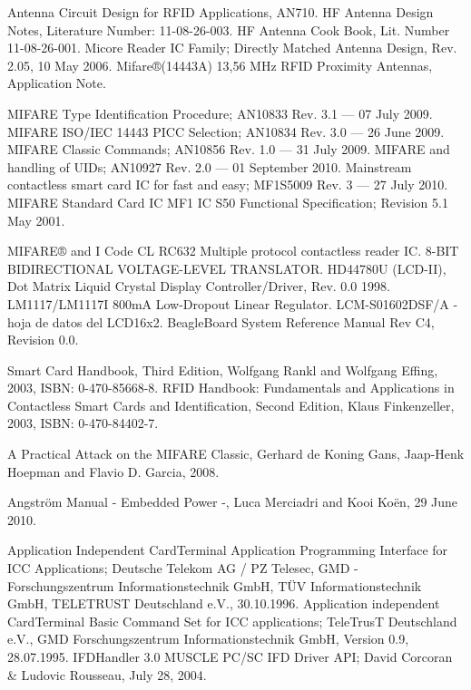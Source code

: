 \begin{thebibliography}{200}

 Antenna Circuit Design for RFID Applications, AN710.
 HF Antenna Design Notes, Literature Number: 11-08-26-003.
 HF Antenna Cook Book, Lit. Number 11-08-26-001.
 Micore Reader IC Family; Directly Matched Antenna Design, Rev. 2.05, 10 May 2006.
 Mifare®(14443A) 13,56 MHz RFID Proximity Antennas, Application Note.

\bibitem{} MIFARE Type Identification Procedure; AN10833 Rev. 3.1 — 07 July 2009.
\bibitem{} MIFARE ISO/IEC 14443 PICC Selection; AN10834 Rev. 3.0 — 26 June 2009.
\bibitem{} MIFARE Classic Commands; AN10856 Rev. 1.0 — 31 July 2009.
\bibitem{} MIFARE and handling of UIDs; AN10927 Rev. 2.0 — 01 September 2010.
\bibitem{} Mainstream contactless smart card IC for fast and easy; MF1S5009 Rev. 3 — 27 July 2010.
\bibitem{} MIFARE Standard Card IC MF1 IC S50 Functional Specification; Revision 5.1 May 2001.

 MIFARE® and I Code CL RC632 Multiple protocol contactless reader IC.
 8-BIT BIDIRECTIONAL VOLTAGE-LEVEL TRANSLATOR.
 HD44780U (LCD-II), Dot Matrix Liquid Crystal Display Controller/Driver, Rev. 0.0 1998. 
 LM1117/LM1117I 800mA Low-Dropout Linear Regulator.
 LCM-S01602DSF/A - hoja de datos del LCD16x2.
 BeagleBoard System Reference Manual Rev C4, Revision 0.0.

 Smart Card Handbook, Third Edition, Wolfgang Rankl and Wolfgang Effing, 2003, ISBN: 0-470-85668-8. 
 RFID Handbook: Fundamentals and Applications in Contactless Smart Cards and Identification,
Second Edition, Klaus Finkenzeller, 2003, ISBN: 0-470-84402-7. 


 A Practical Attack on the MIFARE Classic, Gerhard de Koning Gans, Jaap-Henk Hoepman and Flavio D. Garcia, 2008.

 Angström Manual - Embedded Power -, Luca Merciadri and Kooi Koën, 29 June 2010.


 Application Independent CardTerminal Application Programming Interface for ICC Applications; 
Deutsche Telekom AG / PZ Telesec, GMD - Forschungszentrum Informationstechnik GmbH, TÜV Informationstechnik GmbH, TELETRUST Deutschland e.V., 30.10.1996.
 Application independent CardTerminal Basic Command Set for ICC applications; 
TeleTrusT Deutschland e.V., GMD Forschungszentrum Informationstechnik GmbH, Version 0.9, 28.07.1995.
 IFDHandler 3.0 MUSCLE PC/SC IFD Driver API; David Corcoran \& Ludovic Rousseau, July 28, 2004.



\end{thebibliography}
